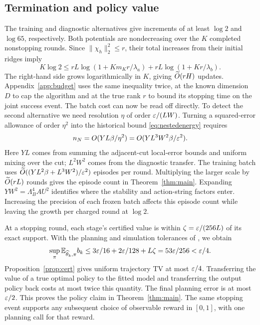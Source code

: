 \subsection{Termination and policy value}
The training and diagnostic alternatives give increments of at least $\log 2$ and $\log 65$, respectively. Both potentials are nondecreasing over the $K$ completed nonstopping rounds. Since $\|\chi_h\|_2^2\le r$, their total increases from their initial ridges imply
\begin{equation}
 K\log2\le rL\log(1+Km_Kr/\lambda_a)
              +rL\log(1+Kr/\lambda_b).
 \label{eq:cap}
\end{equation}
The right-hand side grows logarithmically in $K$, giving $\widetilde O(rH)$ updates. Appendix~\ref{app:budget} uses the same inequality twice, at the known dimension $D$ to cap the algorithm and at the true rank $r$ to bound its stopping time on the joint success event. The batch cost can now be read off directly. To detect the second alternative we need resolution $\eta$ of order $\varepsilon/(LW)$. Turning a squared-error allowance of order $\eta^2$ into the historical bound \eqref{eq:nestedenergy} requires
\[
 n_N=O(YL\beta/\eta^2)=O(YL^3W^2\beta/\varepsilon^2).
\]
Here $YL$ comes from summing the adjacent-cut local-error bounds and uniform mixing over the cut; $L^2W^2$ comes from the diagnostic transfer. The training batch uses $\widetilde O((YL^2\beta+L^3W^2)/\varepsilon^2)$ episodes per round. Multiplying the larger scale by $\widetilde O(rL)$ rounds gives the episode count in Theorem~\ref{thm:main}. Expanding $YW^2=\Lambda_B^4 AU^2$ identifies where the stability and action-string factors enter. Increasing the precision of each frozen batch affects this episode count while leaving the growth per charged round at $\log 2$.

At a stopping round, each stage's certified value is within $\zeta=\varepsilon/(256L)$ of its exact support. With the planning and simulation tolerances of , we obtain
\[
 \sup_\pi\mathbb E_{\widehat\theta_k,\pi}b_k
 \le 3\varepsilon/16+2\varepsilon/128+L\zeta=53\varepsilon/256<\varepsilon/4.
\]
Proposition~\ref{prop:cert} gives uniform trajectory TV at most $\varepsilon/4$. Transferring the value of a true optimal policy to the fitted model and transferring the output policy back costs at most twice this quantity. The final planning error is at most $\varepsilon/2$. This proves the policy claim in Theorem~\ref{thm:main}. The same stopping event supports any subsequent choice of observable reward in $[0,1]$, with one planning call for that reward.
